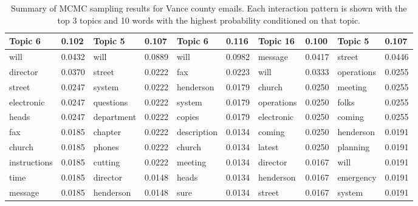 \documentclass[a4paper]{article}
\begin{document}
\begin{table}[ht]
\begin{tabular}{|l|l||l|l||l|l||l|l||l|l|}
	\hline\hline
	Topic 6&0.102&Topic 5&0.107&Topic 6&0.116& Topic 16 & 0.100& Topic 5&0.107\\
	\hline
	\scriptsize will&\scriptsize 0.0432&\scriptsize will&\scriptsize0.0889&\scriptsize will&\scriptsize 0.0982&\scriptsize message&\scriptsize 0.0417&\scriptsize street&\scriptsize 0.0446\\
	\scriptsize director&\scriptsize 0.0370&\scriptsize street&\scriptsize 0.0222&\scriptsize fax&\scriptsize0.0223&\scriptsize will&\scriptsize 0.0333&\scriptsize operations&\scriptsize 0.0255\\
	\scriptsize street&\scriptsize 0.0247&\scriptsize system&\scriptsize  0.0222&\scriptsize henderson&\scriptsize 0.0179&\scriptsize church&\scriptsize 0.0250&\scriptsize meeting&\scriptsize 0.0255\\
	\scriptsize electronic&\scriptsize 0.0247&\scriptsize questions&\scriptsize 0.0222&\scriptsize system&\scriptsize 0.0179&\scriptsize operations&\scriptsize 0.0250&\scriptsize folks&\scriptsize 0.0255\\
	\scriptsize heads&\scriptsize 0.0247&\scriptsize department&\scriptsize 0.0222&\scriptsize copies&\scriptsize 0.0179&\scriptsize electronic&\scriptsize 0.0250&\scriptsize coming&\scriptsize 0.0255\\
	\scriptsize fax&\scriptsize 0.0185&\scriptsize chapter&\scriptsize 0.0222&\scriptsize description&\scriptsize 0.0134&\scriptsize coming&\scriptsize 0.0250&\scriptsize henderson&\scriptsize  0.0191\\
	\scriptsize church&\scriptsize 0.0185&\scriptsize phones&\scriptsize 0.0222&\scriptsize church&\scriptsize  0.0134&\scriptsize latest&\scriptsize 0.0250&\scriptsize planning&\scriptsize 0.0191\\
	\scriptsize instructions&\scriptsize 0.0185&\scriptsize cutting&\scriptsize 0.0222&\scriptsize meeting&\scriptsize  0.0134&\scriptsize director&\scriptsize 0.0167&\scriptsize will&\scriptsize 0.0191\\
	\scriptsize time&\scriptsize 0.0185&\scriptsize director&\scriptsize 0.0148&\scriptsize heads&\scriptsize  0.0134&\scriptsize henderson&\scriptsize 0.0167&\scriptsize emergency&\scriptsize 0.0191\\
	\scriptsize message&\scriptsize 0.0185&\scriptsize henderson&\scriptsize 0.0148&\scriptsize sure&\scriptsize  0.0134&\scriptsize street&\scriptsize 0.0167&\scriptsize system&\scriptsize 0.0191\\
	\hline
\end{tabular}
	 		\caption {Summary of MCMC sampling results for Vance county emails. Each interaction pattern is shown with the top 3 topics and 10 words with the highest probability conditioned on that topic.}
	 		\label{table:Vancewords}
	 		\end{table}
\end{document}
